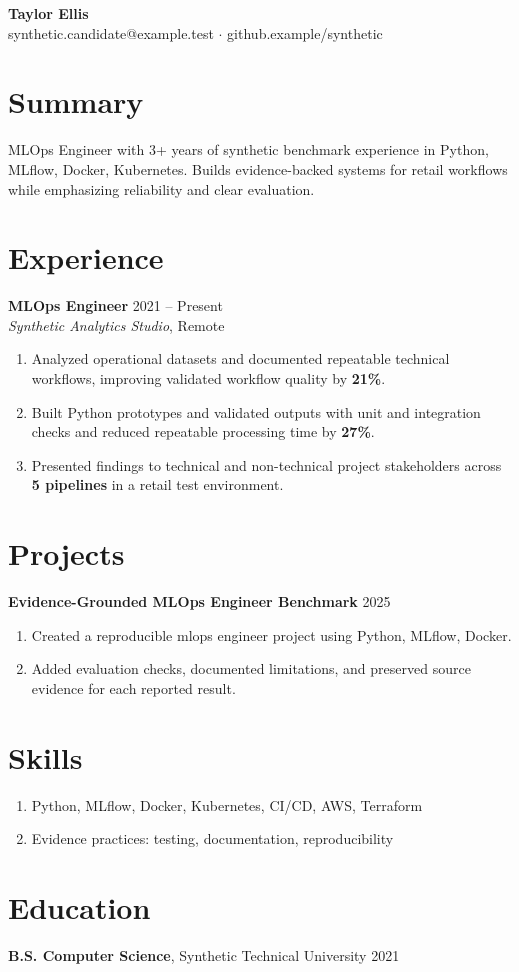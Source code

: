 \documentclass[10pt,letterpaper]{article}
\begin{document}
\begin{center}
{\Large \textbf{Taylor Ellis}}\\
synthetic.candidate@example.test $\cdot$ github.example/synthetic
\end{center}

\section*{Summary}
MLOps Engineer with 3+ years of synthetic benchmark experience in Python, MLflow, Docker, Kubernetes. Builds evidence-backed systems for retail workflows while emphasizing reliability and clear evaluation.

\section*{Experience}
\textbf{MLOps Engineer} \hfill 2021 -- Present\\
\textit{Synthetic Analytics Studio}, Remote
\begin{enumerate}
  \item Analyzed operational datasets and documented repeatable technical workflows, improving validated workflow quality by \textbf{21\%}.
  \item Built Python prototypes and validated outputs with unit and integration checks and reduced repeatable processing time by \textbf{27\%}.
  \item Presented findings to technical and non-technical project stakeholders across \textbf{5 pipelines} in a retail test environment.
\end{enumerate}

\section*{Projects}
\textbf{Evidence-Grounded MLOps Engineer Benchmark} \hfill 2025
\begin{enumerate}
  \item Created a reproducible mlops engineer project using Python, MLflow, Docker.
  \item Added evaluation checks, documented limitations, and preserved source evidence for each reported result.
\end{enumerate}

\section*{Skills}
\begin{enumerate}
  \item Python, MLflow, Docker, Kubernetes, CI/CD, AWS, Terraform
  \item Evidence practices: testing, documentation, reproducibility
\end{enumerate}

\section*{Education}
\textbf{B.S. Computer Science}, Synthetic Technical University \hfill 2021
\end{document}
